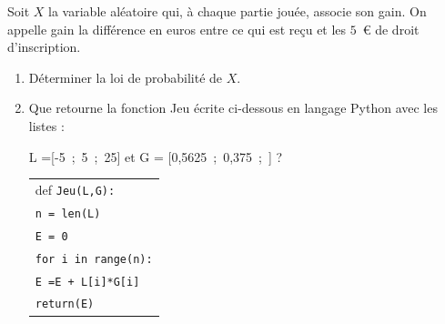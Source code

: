\smallskip

Soit $X$ la variable aléatoire qui, à chaque partie jouée, associe son gain. On appelle gain la différence en euros entre ce qui est reçu et les $5$~\euro{} de droit d'inscription.

\medskip

\begin{enumerate}
\item Déterminer la loi de probabilité de $X$.
\item Que retourne la fonction Jeu écrite ci-dessous en langage Python
avec les listes : 

L =[-5~;~5~;~25] et G = [0,5625~;~0,375~;~] ?

\begin{center}

\begin{tabularx}{0.4\linewidth}{|X|}\hline
def \texttt{Jeu(L,G):}\\
\quad  \texttt{n = len(L)}\\
\quad \texttt{E = 0}\\
\quad \texttt{for i in range(n):}\\
\qquad \texttt{E =E + L[i]*G[i]} \\
\quad \texttt{return(E)}\\ \hline
\end{tabularx}
\end{center}
\end{enumerate}

\bigskip
